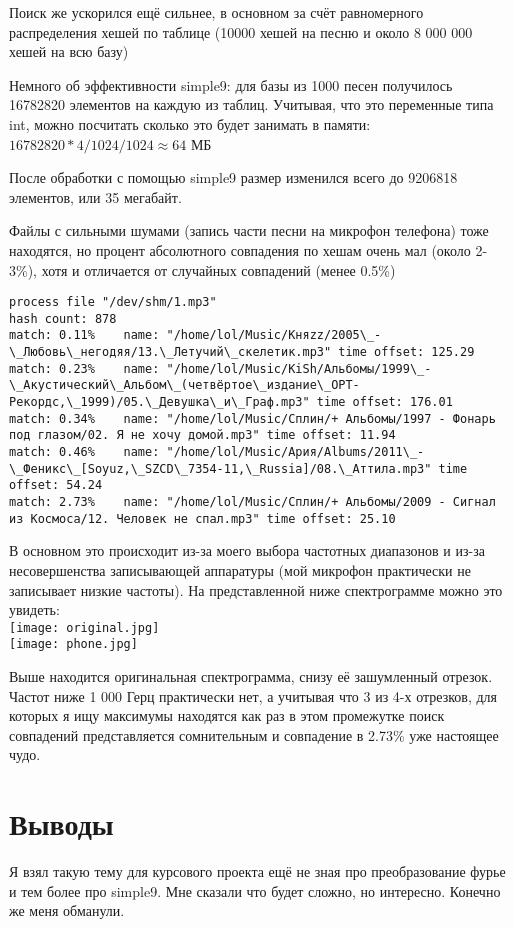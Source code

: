\documentclass[12pt]{article}
\newcommand{\se}[1]{\section*{\bf #1}}
\begin{document}
Поиск же ускорился ещё сильнее, в основном за счёт равномерного распределения хешей по таблице
(10000 хешей на песню и около 8 000 000 хешей на всю базу)

Немного об эффективности simple9: для базы из 1000 песен получилось 16782820
элементов на каждую из таблиц. Учитывая, что это переменные типа int, можно посчитать
сколько это будет занимать в памяти:
$16782820*4/1024/1024 \approx 64$ МБ

После обработки с помощью simple9 размер изменился всего до 9206818 элементов, или 
35 мегабайт.

Файлы с сильными шумами (запись части песни на микрофон телефона) тоже находятся, но
процент абсолютного совпадения по хешам очень мал (около 2-3\%), хотя и отличается от 
случайных совпадений (менее 0.5\%)

\begin{lstlisting}[style=empty,escapechar="]
process file "/dev/shm/1.mp3"
hash count: 878
match: 0.11%	name: "/home/lol/Music/Княzz/2005\_-\_Любовь\_негодяя/13.\_Летучий\_скелетик.mp3" time offset: 125.29
match: 0.23%	name: "/home/lol/Music/KiSh/Альбомы/1999\_-\_Акустический\_Альбом\_(четвёртое\_издание\_ОРТ-Рекордс,\_1999)/05.\_Девушка\_и\_Граф.mp3" time offset: 176.01
match: 0.34%	name: "/home/lol/Music/Сплин/+ Альбомы/1997 - Фонарь под глазом/02. Я не хочу домой.mp3" time offset: 11.94
match: 0.46%	name: "/home/lol/Music/Ария/Albums/2011\_-\_Феникс\_[Soyuz,\_SZCD\_7354-11,\_Russia]/08.\_Аттила.mp3" time offset: 54.24
match: 2.73%	name: "/home/lol/Music/Сплин/+ Альбомы/2009 - Сигнал из Космоса/12. Человек не спал.mp3" time offset: 25.10
\end{lstlisting}

В основном это происходит из-за моего выбора частотных диапазонов и из-за несовершенства
записывающей аппаратуры (мой микрофон практически не записывает низкие частоты). На 
представленной ниже спектрограмме можно это увидеть:\\
\texttt{[image: original.jpg]}\\
\texttt{[image: phone.jpg]}

Выше находится оригинальная спектрограмма, снизу её зашумленный отрезок. Частот ниже 1 000 Герц
практически нет, а учитывая что 3 из 4-х отрезков, для которых я ищу максимумы находятся
как раз в этом промежутке поиск совпадений представляется сомнительным и совпадение в
2.73\% уже настоящее чудо.


\newpage
\se{Выводы}

Я взял такую тему для курсового проекта ещё не зная про преобразование фурье и тем более
про simple9. Мне сказали что будет сложно, но интересно. Конечно же меня обманули.
\end{document}
